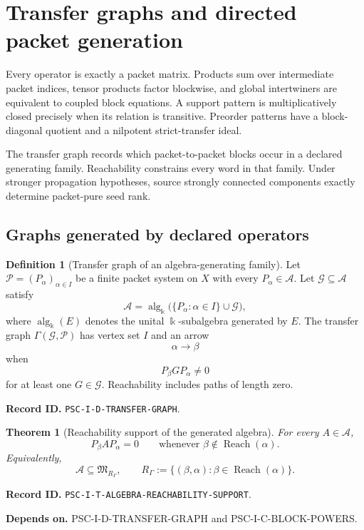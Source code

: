 \documentclass[11pt]{article}
\newtheorem{theorem}{Theorem}[section]
\theoremstyle{definition}
\newtheorem{definition}[definition]{Definition}
\theoremstyle{remark}
\newcommand{\bbk}{\Bbbk}
\newcommand{\A}{\mathcal A}
\newcommand{\Pcal}{\mathcal P}
\newcommand{\alg}{\operatorname{alg}}
\newcommand{\Reach}{\operatorname{Reach}}
\newcommand{\RecordID}[1]{\par\smallskip\noindent\begingroup\footnotesize\color{PSCGray}\raggedright\textbf{Record ID.} \nolinkurl{#1}.\par\endgroup}
\newcommand{\Depends}[1]{\par\noindent\begingroup\footnotesize\color{PSCGray}\raggedright\textbf{Depends on.} #1\par\endgroup}
\begin{document}
\section{Transfer graphs and directed packet generation}

\begin{sectionrecap}
Every operator is exactly a packet matrix.  Products sum over intermediate packet indices, tensor products factor blockwise, and global intertwiners are equivalent to coupled block equations.  A support pattern is multiplicatively closed precisely when its relation is transitive.  Preorder patterns have a block-diagonal quotient and a nilpotent strict-transfer ideal.
\end{sectionrecap}

\begin{readerroadmap}
The transfer graph records which packet-to-packet blocks occur in a declared generating family.  Reachability constrains every word in that family.  Under stronger propagation hypotheses, source strongly connected components exactly determine packet-pure seed rank.
\end{readerroadmap}
\subsection{Graphs generated by declared operators}

\begin{definition}[Transfer graph of an algebra-generating family]
\label{def:transfer-graph}
Let $\Pcal=(P_\alpha)_{\alpha\in I}$ be a finite packet system on $X$ with every $P_\alpha\in\A$.  Let $\mathcal G\subseteq\A$ satisfy
\[
\A=\alg_{\bbk}\bigl(\{P_\alpha:\alpha\in I\}\cup\mathcal G\bigr),
\]
where $\alg_{\bbk}(E)$ denotes the unital $\bbk$-subalgebra generated by $E$.  The transfer graph $\Gamma(\mathcal G,\Pcal)$ has vertex set $I$ and an arrow
\[
\alpha\longrightarrow\beta
\]
when
\[
P_\beta GP_\alpha\neq0
\]
for at least one $G\in\mathcal G$.  Reachability includes paths of length zero.
\end{definition}
\RecordID{PSC-I-D-TRANSFER-GRAPH}

\begin{theorem}[Reachability support of the generated algebra]
\label{thm:algebra-reachability-support}
For every $A\in\A$,
\[
P_\beta AP_\alpha=0
\qquad\text{whenever }\beta\notin\Reach(\alpha).
\]
Equivalently,
\[
\A\subseteq\mathfrak M_{R_\Gamma},
\qquad
R_\Gamma:=\{(\beta,\alpha):\beta\in\Reach(\alpha)\}.
\]
\end{theorem}
\RecordID{PSC-I-T-ALGEBRA-REACHABILITY-SUPPORT}
\Depends{PSC-I-D-TRANSFER-GRAPH and PSC-I-C-BLOCK-POWERS.}
\end{document}
